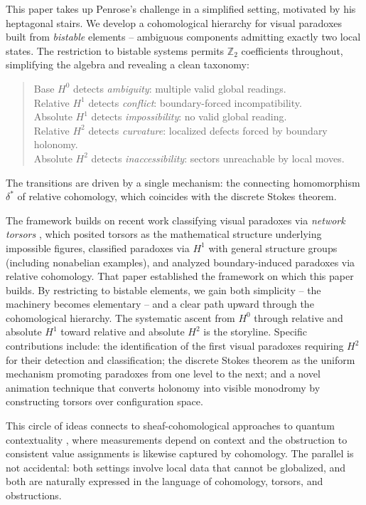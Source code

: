\documentclass[11pt]{amsart}  %
\theoremstyle{plain}
\theoremstyle{definition}
\theoremstyle{remark}
\newcommand{\style}[1]{{\em #1}} %
\newcommand{\connecting}{\delta^*} %
\newcommand{\Z}{\mathbb{Z}} %
\begin{document}
This paper takes up Penrose's challenge in a simplified setting, motivated by his heptagonal stairs. We develop a cohomological hierarchy for visual paradoxes built from \style{bistable} elements -- ambiguous components admitting exactly two local states. The restriction to bistable systems permits $\Z_2$ coefficients throughout, simplifying the algebra and revealing a clean taxonomy:
%
\begin{quote}
Base $H^0$ detects \emph{ambiguity}: multiple valid global readings.\\
Relative $H^1$ detects \emph{conflict}: boundary-forced incompatibility.\\
Absolute $H^1$ detects \emph{impossibility}: no valid global reading.\\
Relative $H^2$ detects \emph{curvature}: localized defects forced by boundary holonomy.\\
Absolute $H^2$ detects \emph{inaccessibility}: sectors unreachable by local moves.
\end{quote}
%
The transitions are driven by a single mechanism: the connecting homomorphism $\connecting$ of relative cohomology, which coincides with the discrete Stokes theorem.

The framework builds on recent work classifying visual paradoxes via \style{network torsors} \cite{GhristCooperband2025Obstructions}, which posited torsors as the mathematical structure underlying impossible figures, classified paradoxes via $H^1$ with general structure groups (including nonabelian examples), and analyzed boundary-induced paradoxes via relative cohomology. That paper established the framework on which this paper builds. By restricting to bistable elements, we gain both simplicity -- the machinery becomes elementary -- and a clear path upward through the cohomological hierarchy. The systematic ascent from $H^0$ through relative and absolute $H^1$ toward relative and absolute $H^2$ is the storyline. Specific contributions include: the identification of the first visual paradoxes requiring $H^2$ for their detection and classification; the discrete Stokes theorem as the uniform mechanism promoting paradoxes from one level to the next; and a novel animation technique that converts holonomy into visible monodromy by constructing torsors over configuration space.

This circle of ideas connects to sheaf-cohomological approaches to quantum contextuality \cite{AbramskyBrandenburger2011Sheaf,AbramskyBarbosa2015Paradox,Caru2017Cohomology}, where measurements depend on context and the obstruction to consistent value assignments is likewise captured by cohomology. The parallel is not accidental: both settings involve local data that cannot be globalized, and both are naturally expressed in the language of cohomology, torsors, and obstructions.
\end{document}
